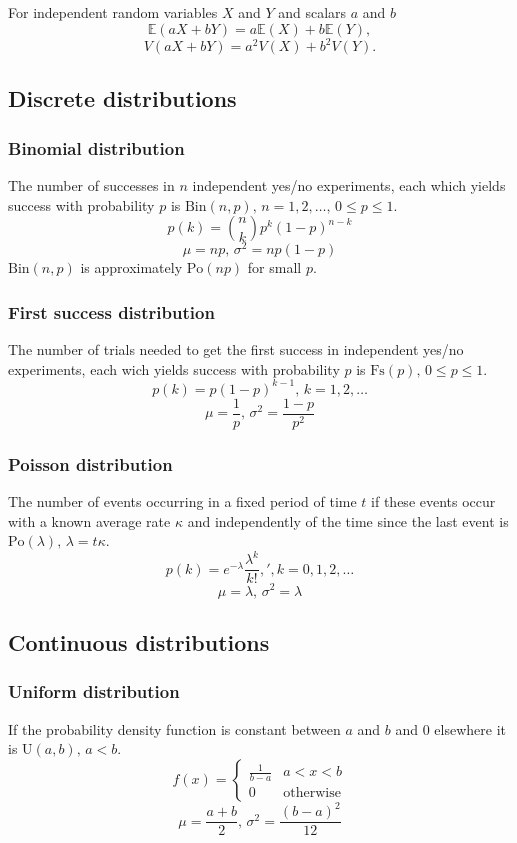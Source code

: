 For independent random variables $X$ and $Y$ and scalars $a$ and $b$
$$\mathbb{E}(aX+bY) = a\mathbb{E}(X)+b\mathbb{E}(Y),$$
$$V(aX+bY) = a^2V(X)+b^2V(Y).$$

\subsection{Discrete distributions}

\subsubsection{Binomial distribution}
The number of successes in $n$ independent yes/no experiments, each which yields success with probability $p$ is $\textrm{Bin}(n,p),\,n=1,2,\dots,\, 0\leq p\leq1$.
$$p(k)=\binom{n}{k}p^k(1-p)^{n-k}$$
$$\mu = np,\,\sigma^2=np(1-p)$$
$\textrm{Bin}(n,p)$ is approximately $\textrm{Po}(np)$ for small $p$.

\subsubsection{First success distribution}
The number of trials needed to get the first success in independent yes/no experiments, each wich yields success with probability $p$ is $\textrm{Fs}(p),\,0\leq p\leq1$.
$$p(k)=p(1-p)^{k-1},\,k=1,2,\dots$$
$$\mu = \frac1p,\,\sigma^2=\frac{1-p}{p^2}$$

\subsubsection{Poisson distribution}
The number of events occurring in a fixed period of time $t$ if these events occur with a known average rate $\kappa$ and independently of the time since the last event is $\textrm{Po}(\lambda),\,\lambda=t\kappa$.
$$p(k)=e^{-\lambda}\frac{\lambda^k}{k!},',k=0,1,2,\dots$$
$$\mu=\lambda,\,\sigma^2=\lambda$$

\subsection{Continuous distributions}

\subsubsection{Uniform distribution}
If the probability density function is constant between $a$ and $b$ and 0 elsewhere it is $\textrm{U}(a,b),\,a<b$.
$$f(x) = \left\{
\begin{array}{cl}
\frac{1}{b-a} & a<x<b\\
0 & \textrm{otherwise}
\end{array}\right.$$
$$\mu=\frac{a+b}{2},\,\sigma^2=\frac{(b-a)^2}{12}$$

